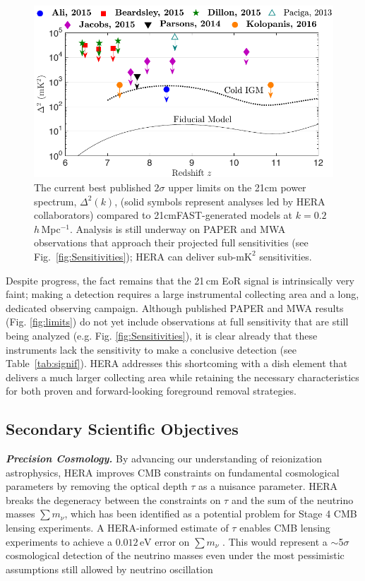 \documentclass[preprint,11pt]{aastex}
\newcommand{\startsquarepar}{%
    \par\begingroup \parfillskip 0pt \relax}
\newcommand{\stopsquarepar}{%
    \par\endgroup}
\begin{document}
\begin{figure}[t]
	\centering
	\includegraphics[width=.8\textwidth]{plots/current_limits.pdf}
	\caption{The current best published $2\sigma$ upper limits on the 21cm power spectrum, $\Delta^2(k)$, (solid symbols represent analyses led by HERA collaborators) compared to 21cmFAST-generated models at $k=0.2$\,$h$\,Mpc$^{-1}$. 
Analysis is still underway on PAPER and MWA observations that approach their projected 
full sensitivities (see Fig.~\ref{fig:Sensitivities}); 
HERA can deliver sub-$\text{mK}^2$ sensitivities.}
	\vspace{-10pt}
	\label{fig:limits}
	\label{fig:IGMtemperatureConstraints}
\end{figure}

Despite progress, the fact remains that the 21\,cm EoR signal is intrinsically very faint; making a detection requires a
large instrumental collecting area and a long, dedicated observing campaign.
Although published PAPER and MWA results (Fig. \ref{fig:limits}) do not yet include observations 
at full sensitivity that are still being analyzed (e.g. Fig. \ref{fig:Sensitivities}), 
it is clear already that these instruments lack the sensitivity
to make a conclusive detection (see Table~\ref{tab:signif}). 
HERA addresses this shortcoming with a dish element that delivers a much larger collecting area 
while retaining the necessary characteristics for both proven and forward-looking foreground removal strategies.

\subsection{Secondary Scientific Objectives}%

\startsquarepar\emph{\textbf{Precision Cosmology.}}
\label{sec:tau}
By advancing our understanding of reionization astrophysics, HERA improves CMB constraints on 
fundamental cosmological parameters by
removing the optical depth
$\tau$ as a nuisance parameter. HERA breaks the degeneracy between the
constraints on $\tau$ and the sum of the neutrino masses $\sum m_\nu$, which has
been identified as a potential problem for Stage 4 CMB lensing experiments. A
HERA-informed estimate of $\tau$ enables CMB lensing experiments to achieve a
$0.012\,\textrm{eV}$ error on $\sum m_\nu$ \citep{liu_et_al2015}. This would
represent a $\sim$5$\sigma$ cosmological detection of the neutrino masses even
under the most pessimistic assumptions
still allowed by neutrino oscillation \stopsquarepar
\end{document}
